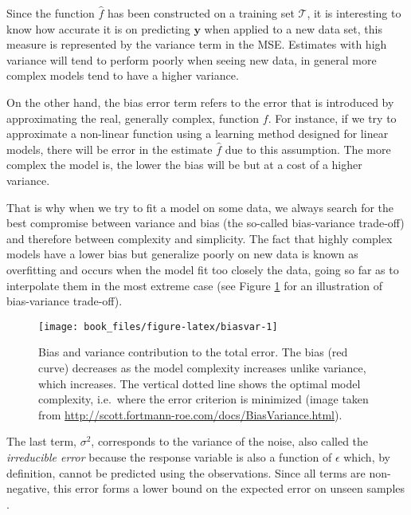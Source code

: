 \documentclass[]{book}
\begin{document}
Since the function \(\hat{f}\) has been constructed on a training set
\(\mathcal{T}\), it is interesting to know how accurate it is on
predicting \(\mathbf{y}\) when applied to a new data set, this measure is
represented by the variance term in the MSE. Estimates with high
variance will tend to perform poorly when seeing new data, in general
more complex models tend to have a higher variance.

On the other hand, the bias error term refers to the error that is
introduced by approximating the real, generally complex, function \(f\).
For instance, if we try to approximate a non-linear function using a
learning method designed for linear models, there will be error in the
estimate \(\hat{f}\) due to this assumption. The more complex the model
is, the lower the bias will be but at a cost of a higher variance.

That is why when we try to fit a model on some data, we always search
for the best compromise between variance and bias (the so-called
bias-variance trade-off) and therefore between complexity and
simplicity. The fact that highly complex models have a lower bias but
generalize poorly on new data is known as overfitting and occurs when
the model fit too closely the data, going so far as to interpolate them
in the most extreme case (see Figure \ref{fig:biasvar} for an
illustration of bias-variance trade-off).



\begin{figure}

{\centering \texttt{[image: book\_files/figure-latex/biasvar-1]} 

}

\caption{Bias and variance contribution to the total error. The bias (red curve) decreases as the model complexity increases unlike variance, which increases. The vertical dotted line shows the optimal model complexity, i.e.~where the error criterion is minimized (image taken from \url{http://scott.fortmann-roe.com/docs/BiasVariance.html}).}\label{fig:biasvar}
\end{figure}

The last term, \(\sigma^2\), corresponds to the variance of the noise,
also called the \emph{irreducible error} because the response variable is
also a function of \(\epsilon\) which, by definition, cannot be predicted
using the observations. Since all terms are non-negative, this error
forms a lower bound on the expected error on unseen samples
\citep{friedman2001elements}.
\end{document}
